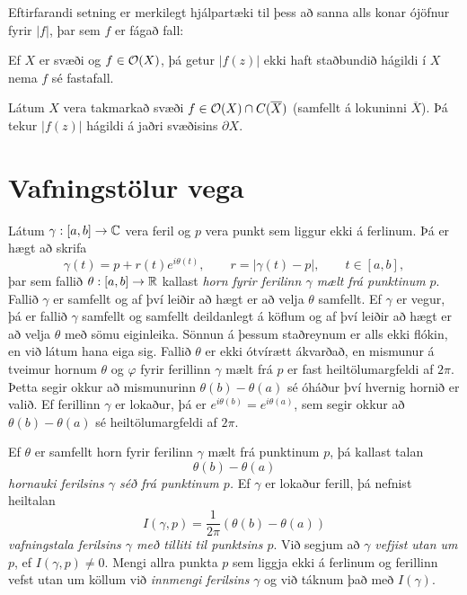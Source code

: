 \noindent
Eftirfarandi setning er merkilegt hjálpartæki til þess að sanna alls
konar ójöfnur fyrir $|f|$, þar sem $f$ er fágað fall:


\begin{se}\label{set10.9.1} 
 Ef $X$ er svæði og $f\in {\cal O}(X)$, þá getur
$|f(z)|$ ekki haft staðbundið hágildi í $X$ nema $f$ sé fastafall.
\end{se}

\begin{se}  Látum $X$ vera takmarkað svæði $f\in
{\cal O}(X)\cap C(\overline X)$ (samfellt á lokuninni $\overline X$).  Þá
tekur $|f(z)|$ hágildi á jaðri svæðisins $\partial X$.
\end{se}


\section{Vafningstölur vega}

\noindent
Látum $\gamma:[a,b]\to {\mathbb C}$ vera feril og $p$ vera punkt sem liggur
ekki á ferlinum.  Þá er hægt að skrifa 
 $$\gamma(t)=p+r(t)e^{i\theta(t)}, \qquad r=|\gamma(t)-p|, \qquad t\in [a,b],
 $$
þar sem fallið $\theta:[a,b]\to {\mathbb R}$ kallast  {\it horn fyrir
ferilinn $\gamma$ mælt frá punktinum} $p$.
Fallið $\gamma$ er samfellt og af því leiðir að hægt er að velja
$\theta$ samfellt.  Ef $\gamma$ er vegur, þá er fallið $\gamma$
samfellt og samfellt deildanlegt á köflum og af því leiðir að hægt er
að velja $\theta$ með sömu eiginleika.  Sönnun á þessum staðreynum er
alls ekki flókin, en við látum hana eiga sig.  Fallið $\theta$ er ekki
ótvírætt ákvarðað, en mismunur á tveimur hornum $\theta$ og $\varphi$
fyrir ferillinn $\gamma$ mælt frá $p$ er fast heiltölumargfeldi af
$2\pi$. Þetta segir okkur að mismunurinn $\theta(b)-\theta(a)$ sé
óháður því hvernig hornið er valið. Ef ferillinn $\gamma$ er lokaður,
þá er $e^{i\theta(b)}=e^{i\theta(a)}$, sem segir okkur að
$\theta(b)-\theta(a)$ sé heiltölumargfeldi af $2\pi$.

\begin{sk}
Ef $\theta$ er samfellt horn fyrir ferilinn $\gamma$ mælt frá
punktinum $p$, þá kallast talan
$$ \theta(b)-\theta(a) $$
{\it hornauki ferilsins $\gamma$ séð frá
punktinum $p$.} Ef $\gamma$ er lokaður ferill, þá nefnist heiltalan
$$ I(\gamma,p)=\dfrac 1{2\pi}(\theta(b)-\theta(a)) $$
{\it vafningstala
ferilsins
$\gamma$ með tilliti til punktsins $p$}.
Við segjum að $\gamma$ {\it vefjist utan um} $p$, ef
$I(\gamma,p)\neq 0$.  Mengi allra punkta $p$ sem liggja ekki á
ferlinum og ferillinn vefst utan um köllum við {\it innmengi
ferilsins} $\gamma$ og við táknum það með
$I(\gamma)$.
\end{sk}

